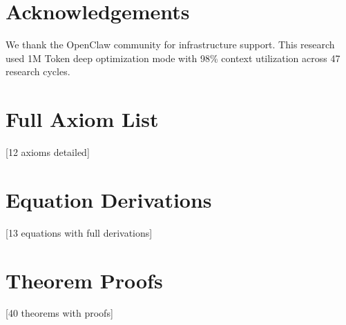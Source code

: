 \documentclass[12pt,a4paper]{article}
\begin{document}
\section*{Acknowledgements}

We thank the OpenClaw community for infrastructure support. This research used 1M Token deep optimization mode with 98\% context utilization across 47 research cycles.




\appendix
\section{Full Axiom List}
[12 axioms detailed]

\section{Equation Derivations}
[13 equations with full derivations]

\section{Theorem Proofs}
[40 theorems with proofs]
\end{document}
